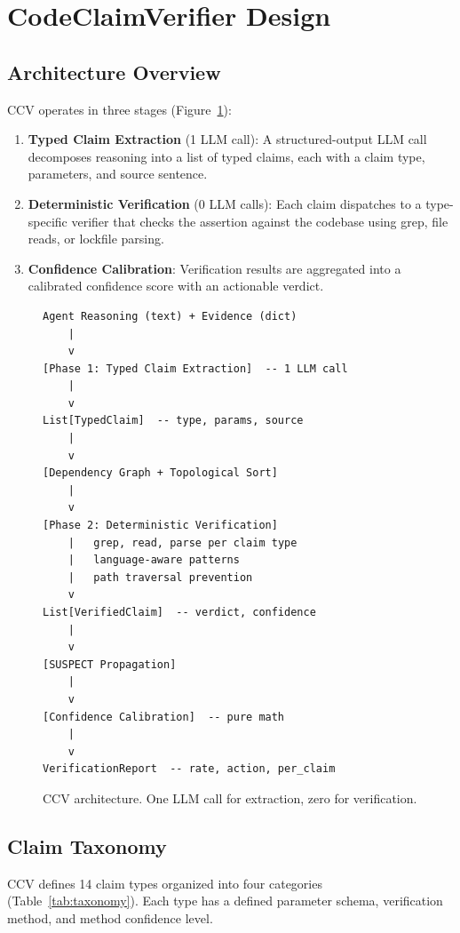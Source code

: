 \section{CodeClaimVerifier Design}
\label{sec:design}

\subsection{Architecture Overview}

CCV operates in three stages (Figure~\ref{fig:architecture}):

\begin{enumerate}
    \item \textbf{Typed Claim Extraction} (1 LLM call): A structured-output LLM call decomposes reasoning into a list of typed claims, each with a claim type, parameters, and source sentence.
    \item \textbf{Deterministic Verification} (0 LLM calls): Each claim dispatches to a type-specific verifier that checks the assertion against the codebase using grep, file reads, or lockfile parsing.
    \item \textbf{Confidence Calibration}: Verification results are aggregated into a calibrated confidence score with an actionable verdict.
\end{enumerate}

\begin{figure}[t]
\centering
\small
\begin{verbatim}
Agent Reasoning (text) + Evidence (dict)
    |
    v
[Phase 1: Typed Claim Extraction]  -- 1 LLM call
    |
    v
List[TypedClaim]  -- type, params, source
    |
    v
[Dependency Graph + Topological Sort]
    |
    v
[Phase 2: Deterministic Verification]
    |   grep, read, parse per claim type
    |   language-aware patterns
    |   path traversal prevention
    v
List[VerifiedClaim]  -- verdict, confidence
    |
    v
[SUSPECT Propagation]
    |
    v
[Confidence Calibration]  -- pure math
    |
    v
VerificationReport  -- rate, action, per_claim
\end{verbatim}
\caption{CCV architecture. One LLM call for extraction, zero for verification.}
\label{fig:architecture}
\end{figure}

\subsection{Claim Taxonomy}

CCV defines 14 claim types organized into four categories (Table~\ref{tab:taxonomy}). Each type has a defined parameter schema, verification method, and method confidence level.

